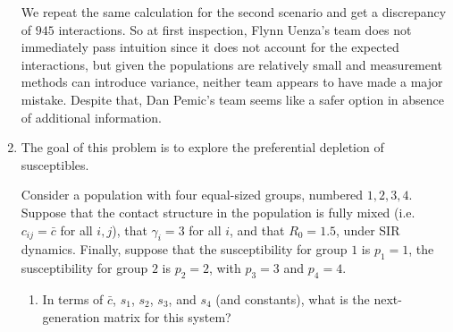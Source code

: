 \documentclass[11pt]{article}
\begin{document}
\begin{enumerate}
\begin{tcolorbox}
	We repeat the same calculation for the second scenario and get a discrepancy of $945$ interactions. So at first inspection, Flynn Uenza's team does not immediately pass intuition since it does not account for the expected interactions, but given the populations are relatively small and measurement methods can introduce variance, neither team appears to have made a major mistake. Despite that, Dan Pemic's team seems like a safer option in absence of additional information.
\end{tcolorbox}

\clearpage
\item The goal of this problem is to explore the preferential depletion of susceptibles. 

Consider a population with four equal-sized groups, numbered $1, 2, 3, 4$. Suppose that the contact structure in the population is fully mixed (i.e. $c_{ij} = \bar{c}$ for all $i,j$), that $\gamma_i = 3$ for all $i$, and that $R_0=1.5$, under SIR dynamics. Finally, suppose that the susceptibility for group $1$ is $p_1=1$, the susceptibility for group $2$ is $p_2=2$, with $p_3 = 3$ and $p_4=4$. 

\begin{enumerate}[label=\alph*.]
	\item In terms of $\bar{c}$, $s_1$, $s_2$, $s_3$, and $s_4$ (and constants), what is the next-generation matrix for this system?
	

\end{enumerate}
\end{enumerate}
\end{document}
